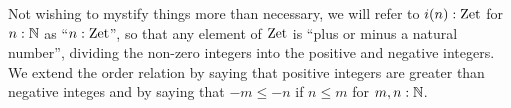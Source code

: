 Not wishing to mystify things more than necessary, we will refer to $i(n):\mathrm{Zet}$ for $n:\mathbb{N}$ as ``$n:\mathrm{Zet}$'', so that any element of $\mathrm{Zet}$ is ``plus or minus a natural number'', dividing the non-zero integers into the positive and negative integers.  We extend the order relation by saying that positive integers are greater than negative integes and by saying that $-m\leq -n$ if $n\leq m$ for $m,n:\mathbb{N}$.




